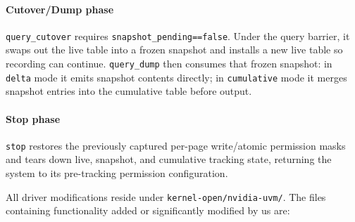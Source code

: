 \paragraph{Cutover/Dump phase}
\texttt{query\_cutover} requires \texttt{snapshot\_pending==false}. Under the
query barrier, it swaps out the live table into a frozen snapshot and installs
a new live table so recording can continue. \texttt{query\_dump} then consumes
that frozen snapshot: in \texttt{delta} mode it emits snapshot contents
directly; in \texttt{cumulative} mode it merges snapshot entries into the
cumulative table before output.

\paragraph{Stop phase}
\texttt{stop} restores the previously captured per-page write/atomic permission
masks and tears down live, snapshot, and cumulative tracking state, returning
the system to its pre-tracking permission configuration.

All driver modifications reside under \texttt{kernel-open/nvidia-uvm/}.
The files containing functionality added or significantly modified by us are:

